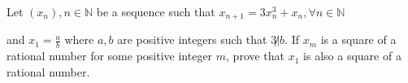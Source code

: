 Let $(x_n), n\in\mathbb{N}$ be a sequence such that $x_{n+1}=3x_n^3+x_n, \forall n\in\mathbb{N}$

and $x_1=\frac{a}{b}$ where $a,b$ are positive integers such that $3\not|b$. If $x_m$ is a square of a rational number for some positive integer $m$,  prove that $x_1$ is also a square of a rational number.